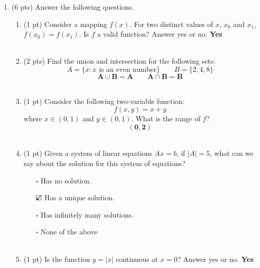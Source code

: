 \documentclass{./../../../Latex/tests}
\begin{document}
\thispagestyle{plain}

\vspace{0.5em}

\begin{enumerate}
\item (6 pts) Answer the following questions. 
\begin{enumerate}
\item (1 pt) Consider a mapping $f(x)$. For two distinct values of $x$, $x_0$ and $x_1$, $f(x_0) = f(x_1)$. Is $f$ a valid function? Answer yes or no. \textbf{Yes} \\~\\
\item (2 pts) Find the union and intersection for the following sets:
$$ A = \{x: x \text{ is an even number} \} \quad \quad B = \{2, 4, 8 \} $$ 
$$\mathbf{ A \cup B = A \quad \quad A \cap B = B }$$ \\
\item (1 pt) Consider the following two-variable function: 
  $$ f(x,y) = x+y $$
  where $x \in (0,1)$ and $y \in (0,1)$. What is the range of $f$? $$\mathbf{(0,2)}$$ \\
 
\item (1 pt) Given a system of linear equations $A x = b$, if $|A|=5$, what can we say about the solution for this system of equations?
\begin{itemize}
	\item[$\square$] Has no solution. 
	\item[$\text{\rlap{$\checkmark$}}\square$] Has a unique solution.
	\item[$\square$] Has infinitely many solutions.
	\item[$\square$] None of the above \\~\\
\end{itemize}  
\item (1 pt) Is the function $y=|x|$ continuous at $x=0$? Answer yes or no. \textbf{Yes}
\end{enumerate} 


\end{enumerate}
\end{document}
